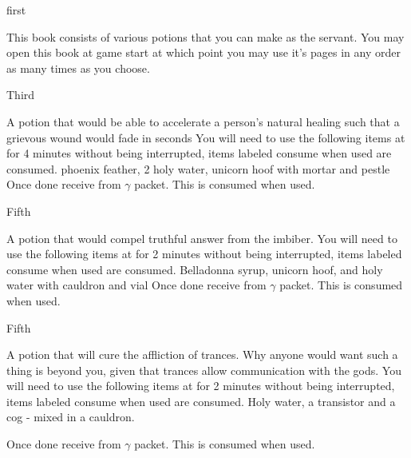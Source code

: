 \documentclass[greennotebook]{guildcamp3} %
\begin{document}
\startnotebook{\nServantPotions{}}

\begin{page}{first}
	
	This book consists of various potions that you can make as the servant. You may open this book at game start at which point you may use it's pages in any order as many times as you choose. 
	
\end{page}

\begin{page}{Third}
	
	A potion that would be able to accelerate a person's natural healing such that a grievous wound would fade in seconds
	You will need to use the following items at \sMageWorkbench{} for 4 minutes without being interrupted, items labeled consume when used are consumed.
	phoenix feather, 2 holy water, unicorn hoof with mortar and pestle
	Once done receive \iHealthRemedy{} from $\gamma$ packet. This is consumed when used. 
	
\end{page}

\begin{page}{Fifth}
	
	A potion that would compel truthful answer from the imbiber.
	You will need to use the following items at \sMageWorkbench{} for 2 minutes without being interrupted, items labeled consume when used are consumed.
	Belladonna syrup, unicorn hoof, and holy water with cauldron and vial
	Once done receive \iTruthPotion{} from $\gamma$ packet. This is consumed when used. 
	
\end{page}

\begin{page}{Fifth}
	
	A potion that will cure the affliction of trances. Why anyone would want such a thing is beyond you, given that trances allow communication with the gods. 
	You will need to use the following items at \sMageWorkbench{} for 2 minutes without being interrupted, items labeled consume when used are consumed.
	Holy water, a transistor and a cog - mixed in a cauldron. 
	
	Once done receive \iTranceCure{} from $\gamma$ packet. This is consumed when used. 
	
\end{page}

\endnotebook
\end{document}
